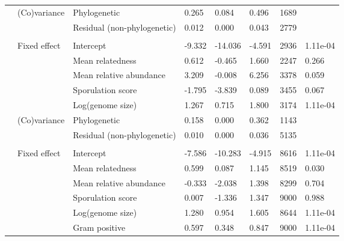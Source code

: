 \documentclass[border=1mm, preview]{standalone}
\begin{document}
\begin{table}
\begin{tabular}[t]{llllllll}
\hspace{1em} & (Co)variance & Phylogenetic & 0.265 & 0.084 & 0.496 & 1689 & \\
\hspace{1em} &  & Residual (non-phylogenetic) & 0.012 & 0.000 & 0.043 & 2779 & \\
\addlinespace[0.3em]
\multicolumn{8}{l}{\textbf{Antibiotic degradation}}\\
\hspace{1em} & Fixed effect & Intercept & -9.332 & -14.036 & -4.591 & 2936 & 1.11e-04\\
\hspace{1em} &  & Mean relatedness & 0.612 & -0.465 & 1.660 & 2247 & 0.266\\
\hspace{1em} &  & Mean relative abundance & 3.209 & -0.008 & 6.256 & 3378 & 0.059\\
\hspace{1em} &  & Sporulation score & -1.795 & -3.839 & 0.089 & 3455 & 0.067\\
\hspace{1em} &  & Log(genome size) & 1.267 & 0.715 & 1.800 & 3174 & 1.11e-04\\
\hspace{1em} & (Co)variance & Phylogenetic & 0.158 & 0.000 & 0.362 & 1143 & \\
\hspace{1em} &  & Residual (non-phylogenetic) & 0.010 & 0.000 & 0.036 & 5135 & \\
\addlinespace[0.3em]
\multicolumn{8}{l}{\textbf{Secretome}}\\
\hspace{1em} & Fixed effect & Intercept & -7.586 & -10.283 & -4.915 & 8616 & 1.11e-04\\
\hspace{1em} &  & Mean relatedness & 0.599 & 0.087 & 1.145 & 8519 & 0.030\\
\hspace{1em} &  & Mean relative abundance & -0.333 & -2.038 & 1.398 & 8299 & 0.704\\
\hspace{1em} &  & Sporulation score & 0.007 & -1.336 & 1.347 & 9000 & 0.988\\
\hspace{1em} &  & Log(genome size) & 1.280 & 0.954 & 1.605 & 8644 & 1.11e-04\\
\hspace{1em} &  & Gram positive & 0.597 & 0.348 & 0.847 & 9000 & 1.11e-04\\

\end{tabular}
\end{table}
\end{document}
